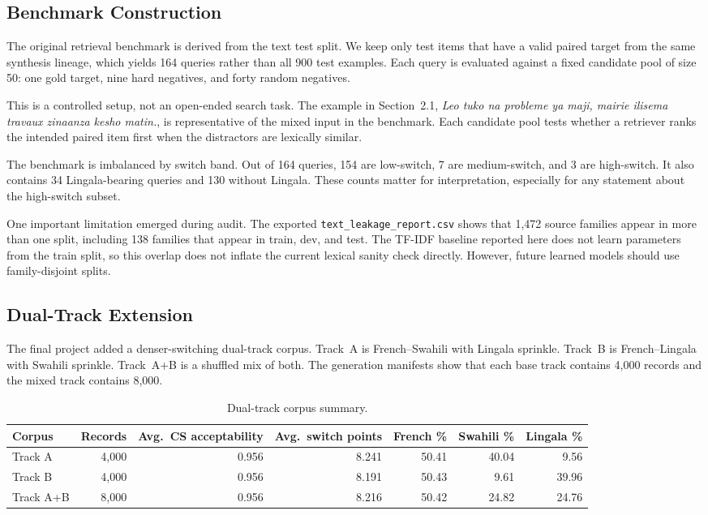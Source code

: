 \documentclass[11pt,twocolumn]{article}
\begin{document}
\subsection{Benchmark Construction}
The original retrieval benchmark is derived from the text test split. We keep only test items that have a valid paired target from the same synthesis lineage, which yields 164 queries rather than all 900 test examples. Each query is evaluated against a fixed candidate pool of size 50: one gold target, nine hard negatives, and forty random negatives.

This is a controlled setup, not an open-ended search task. The example in Section~2.1, \emph{Leo tuko na probleme ya maji, mairie ilisema travaux zinaanza kesho matin.}, is representative of the mixed input in the benchmark. Each candidate pool tests whether a retriever ranks the intended paired item first when the distractors are lexically similar.

The benchmark is imbalanced by switch band. Out of 164 queries, 154 are low-switch, 7 are medium-switch, and 3 are high-switch. It also contains 34 Lingala-bearing queries and 130 without Lingala. These counts matter for interpretation, especially for any statement about the high-switch subset.

One important limitation emerged during audit. The exported \texttt{text\_leakage\_report.csv} shows that 1{,}472 source families appear in more than one split, including 138 families that appear in train, dev, and test. The TF-IDF baseline reported here does not learn parameters from the train split, so this overlap does not inflate the current lexical sanity check directly. However, future learned models should use family-disjoint splits.

\subsection{Dual-Track Extension}
The final project added a denser-switching dual-track corpus. Track~A is French--Swahili with Lingala sprinkle. Track~B is French--Lingala with Swahili sprinkle. Track~A+B is a shuffled mix of both. The generation manifests show that each base track contains 4{,}000 records and the mixed track contains 8{,}000.

\begin{table}[t]
\centering
\small
\caption{Dual-track corpus summary.}
\label{tab:dualdata}
\begin{tabular}{@{}lrrrrrr@{}}
\toprule
Corpus & Records & Avg.\ CS acceptability & Avg.\ switch points & French \% & Swahili \% & Lingala \% \\
\midrule
Track A & 4{,}000 & 0.956 & 8.241 & 50.41 & 40.04 & 9.56 \\
Track B & 4{,}000 & 0.956 & 8.191 & 50.43 & 9.61 & 39.96 \\
Track A+B & 8{,}000 & 0.956 & 8.216 & 50.42 & 24.82 & 24.76 \\
\bottomrule
\end{tabular}
\end{table}
\end{document}
